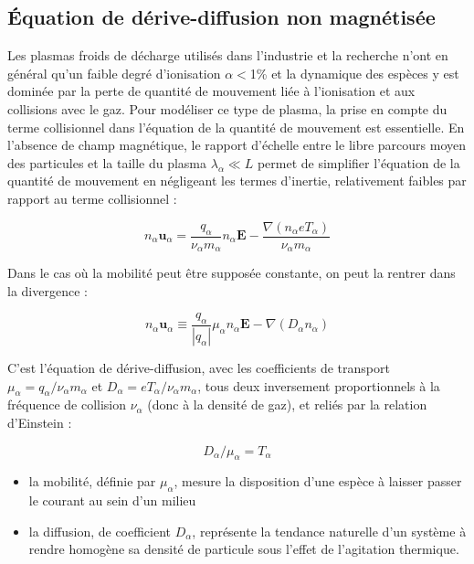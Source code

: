 \begin{refsection}
\subsection{Équation de dérive-diffusion non magnétisée}
Les plasmas froids de décharge utilisés dans l'industrie et la recherche n'ont
en général qu'un faible degré d'ionisation $\alpha<$1\% et la dynamique des
espèces y est dominée par la perte de quantité de mouvement liée à l'ionisation
et aux collisions avec le gaz. Pour modéliser ce type de plasma, la prise en
compte du terme collisionnel dans l'équation de la quantité de mouvement est
essentielle.
En l'absence de champ magnétique, le rapport d'échelle entre le libre parcours moyen des particules
et la taille du plasma $\lambda_\alpha\ll L$ permet de simplifier l'équation de
la quantité de mouvement en négligeant les termes d'inertie, relativement
faibles par rapport au terme collisionnel :

\begin{equation}
\label{1-eqDriftDif}
n_\alpha\mathbf u_\alpha=\frac{q_\alpha}{\nu_\alpha m_\alpha}n_\alpha\mathbf
E-\frac{\nabla\left(n_\alpha eT_\alpha\right)}{\nu_\alpha
m_\alpha}
\end{equation}

Dans le cas où la mobilité peut être supposée constante, on peut la rentrer dans
la divergence :

\begin{equation}
\label{1-eqDriftDif}
n_\alpha\mathbf u_\alpha\equiv\frac{q_\alpha}{|q_\alpha|}\mu_\alpha n_\alpha\mathbf
E-{\nabla\left(D_\alpha n_\alpha\right)}
\end{equation}

 C'est l'équation de dérive-diffusion, avec les coefficients de
transport $\mu_\alpha=q_\alpha/\nu_\alpha m_\alpha$ et
$D_\alpha=eT_\alpha/\nu_\alpha m_\alpha$, tous deux inversement proportionnels à la fréquence de collision $\nu_\alpha$ (donc à la
densité de gaz), et reliés par la relation d'Einstein :

\begin{equation}
\label{1-EinsteinRelation}
D_\alpha/\mu_\alpha=T_\alpha
\end{equation}

\begin{itemize}
  \item la mobilité, définie par $\mu_\alpha$,
  mesure la disposition d'une espèce à laisser passer le courant au sein d'un milieu
  \item la diffusion, de coefficient $D_\alpha$,
  représente la tendance naturelle d'un système à rendre homogène sa densité de particule sous l'effet
  de l'agitation thermique.
\end{itemize}


\end{refsection}

